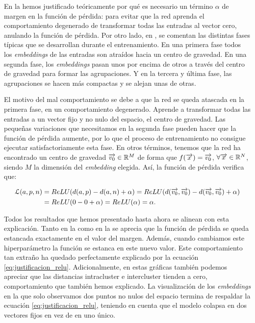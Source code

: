 En la  hemos justificado teóricamente por qué es necesario un término $\alpha$ de margen en la función de pérdida: para evitar que la red aprenda el comportamiento degenerado de transformar todas las entradas al vector cero, anulando la función de pérdida. Por otro lado, en \cite{informatica:principal}, se comentan las distintas fases típicas que se desarrollan durante el entrenamiento. En una primera fase todos los \textit{embeddings} de las entradas son atraídos hacia un centro de gravedad. En una segunda fase, los \textit{embeddings} pasan unos por encima de otros a través del centro de gravedad para formar las agrupaciones. Y en la tercera y última fase, las agrupaciones se hacen más compactas y se alejan unas de otras.

El motivo del mal comportamiento se debe a que la red se queda atascada en la primera fase, en un comportamiento degenerado. Aprende a transformar todas las entradas a un vector fijo y no nulo del espacio, el centro de gravedad. Las pequeñas variaciones que necesitamos en la segunda fase pueden hacer que la función de pérdida aumente, por lo que el proceso de entrenamiento no consigue ejecutar satisfactoriamente esta fase. En otros términos, tenemos que la red ha encontrado un centro de gravedad $\overrightarrow{v_0} \in \mathbb{R}^M$ de forma que $f(\overrightarrow{x}) = \overrightarrow{v_0}$, $\forall \overrightarrow{x} \in \mathbb{R}^N$, siendo $M$ la dimensión del \textit{embedding} elegida. Así, la función de pérdida verifica que:

\begin{equation} \label{eq:justificacion_relu}
\begin{split}
    \mathcal{L}(a, p, n) &= ReLU(d(a, p) - d(a, n) + \alpha) = ReLU(d(\overrightarrow{v_0}, \overrightarrow{v_0}) - d(\overrightarrow{v_0}, \overrightarrow{v_0}) + \alpha) \\
    &= ReLU(0 - 0 + \alpha) = ReLU(\alpha) = \alpha.
\end{split}
\end{equation}

Todos los resultados que hemos presentado hasta ahora se alinean con esta explicación. Tanto en la  como en la  se aprecia que la función de pérdida se queda estancada exactamente en el valor del margen. Además, cuando cambiamos este hiperparámetro la función se estanca en este nuevo valor. Este comportamiento tan extraño ha quedado perfectamente explicado por la ecuación \eqref{eq:justificacion_relu}. Adicionalmente, en estas gráficas también podemos apreciar que las distancias intracluster e intercluster tienden a cero, comportamiento que también hemos explicado. La visualización de los \textit{embeddings} en la que solo observamos dos puntos no nulos del espacio termina de respaldar la ecuación \eqref{eq:justificacion_relu}, teniendo en cuenta que el modelo colapsa en dos vectores fijos en vez de en uno único.

